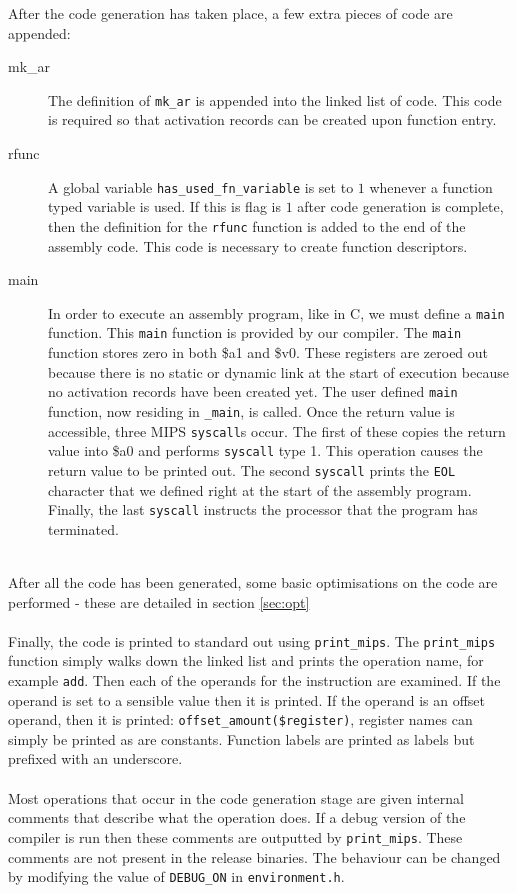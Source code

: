 After the code generation has taken place, a few extra pieces of code are appended:
\begin{description}
	\item[mk\_ar] The definition of \verb!mk_ar! is appended into the linked list of code. This code is required so that activation records can be created upon function entry.
	\item[rfunc] A global variable \verb!has_used_fn_variable! is set to $1$ whenever a function typed variable is used. If this is flag is $1$ after code generation is complete, then the definition for the \verb!rfunc! function is added to the end of the assembly code. This code is necessary to create function descriptors.
	\item[main] In order to execute an assembly program, like in C, we must define a \verb!main! function. This \verb!main! function is provided by our compiler. The \verb!main! function stores zero in both \$a1 and \$v0. These registers are zeroed out because there is no static or dynamic link at the start of execution because no activation records have been created yet. The user defined \verb!main! function, now residing in \verb!_main!, is called. Once the return value is accessible, three MIPS \verb!syscall!s occur. The first of these copies the return value into \$a0 and performs \verb!syscall! type 1. This operation causes the return value to be printed out. The second \verb!syscall! prints the \verb!EOL! character that we defined right at the start of the assembly program. Finally, the last \verb!syscall! instructs the processor that the program has terminated.
\end{description}
\ \\
After all the code has been generated, some basic optimisations on the code are performed - these are detailed in section \ref{sec:opt}
\ \\ \ \\
Finally, the code is printed to standard out using \verb!print_mips!. The \verb!print_mips! function simply walks down the linked list and prints the operation name, for example \verb!add!. Then each of the operands for the instruction are examined. If the operand is set to a sensible value then it is printed. If the operand is an offset operand, then it is printed: \verb!offset_amount($register)!, register names can simply be printed as are constants. Function labels are printed as labels but prefixed with an underscore.
\ \\ \ \\
Most operations that occur in the code generation stage are given internal comments that describe what the operation does. If a debug version of the compiler is run then these comments are outputted by \verb!print_mips!. These comments are not present in the release binaries. The behaviour can be changed by modifying the value of \verb!DEBUG_ON! in \verb!environment.h!.

